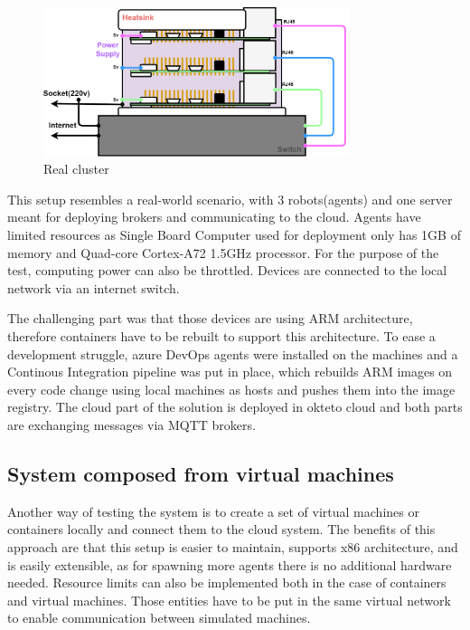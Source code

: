 \begin{figure}[H]
    \centering
    \includegraphics[width=0.8\textwidth]{pictures/cluster.png}
    \caption{ Real cluster }
    \label{fig:cluster}
\end{figure}

This setup resembles a real-world scenario, with 3 robots(agents) and one server meant for deploying brokers and communicating to the cloud. Agents have limited resources as Single Board Computer used for deployment only has 1GB of memory and Quad-core Cortex-A72 1.5GHz processor\cite{rpi_specs}. For the purpose of the test, computing power can also be throttled. Devices are connected to the local network via an internet switch. 

The challenging part was that those devices are using ARM architecture, therefore containers have to be rebuilt to support this architecture. To ease a development struggle, azure DevOps agents were installed on the machines and a Continous Integration pipeline was put in place, which rebuilds ARM images on every code change using local machines as hosts and pushes them into the image registry. The cloud part of the solution is deployed in okteto cloud and both parts are exchanging messages via MQTT brokers.

\subsection{System composed from virtual machines}
Another way of testing the system is to create a set of virtual machines or containers locally and connect them to the cloud system. The benefits of this approach are that this setup is easier to maintain, supports x86 architecture, and is easily extensible, as for spawning more agents there is no additional hardware needed. Resource limits can also be implemented both in the case of containers and virtual machines. Those entities have to be put in the same virtual network to enable communication between simulated machines.